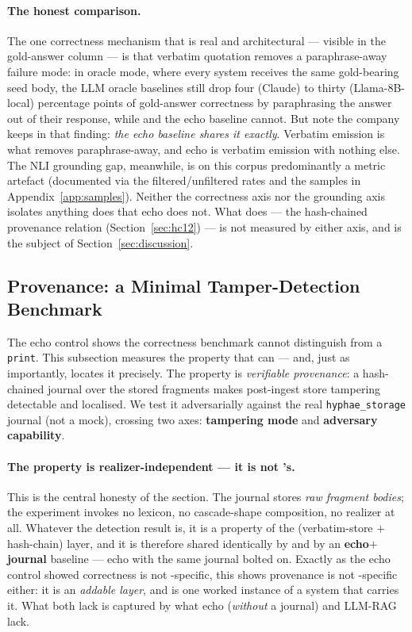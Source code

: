 \paragraph{The honest comparison.}
The one correctness mechanism that is real and architectural ---
visible in the gold-answer column --- is that verbatim quotation
removes a paraphrase-away failure mode: in oracle mode, where
every system receives the same gold-bearing seed body, the LLM
oracle baselines still drop four (Claude) to thirty
(Llama-8B-local) percentage points of gold-answer correctness by
paraphrasing the answer out of their response, while \hyphae{}
and the echo baseline cannot. But note the company \hyphae{}
keeps in that finding: \emph{the echo baseline shares it
exactly}. Verbatim emission is what removes paraphrase-away, and
echo is verbatim emission with nothing else. The NLI grounding
gap, meanwhile, is on this corpus predominantly a metric artefact
(documented via the filtered/unfiltered rates and the samples in
Appendix~\ref{app:samples}). Neither the correctness axis nor the
grounding axis isolates anything \hyphae{} does that echo does
not. What does --- the hash-chained provenance relation
(Section~\ref{sec:hc12}) --- is not measured by either axis, and
is the subject of Section~\ref{sec:discussion}.

\subsection{Provenance: a Minimal Tamper-Detection Benchmark}
\label{sec:results-provenance}

The echo control shows the correctness benchmark cannot
distinguish \hyphae{} from a \texttt{print}. This subsection
measures the property that can --- and, just as importantly,
locates it precisely. The property is \emph{verifiable
provenance}: a hash-chained journal over the stored fragments
makes post-ingest store tampering detectable and localised. We
test it adversarially against the real \texttt{hyphae\_storage}
journal (not a mock), crossing two axes: \textbf{tampering mode}
and \textbf{adversary capability}.

\paragraph{The property is realizer-independent --- it is not
\hyphae{}'s.} This is the central honesty of the section. The
journal stores \emph{raw fragment bodies}; the experiment invokes
no lexicon, no cascade-shape composition, no realizer at all.
Whatever the detection result is, it is a property of the
(verbatim-store $+$ hash-chain) layer, and it is therefore shared
identically by \hyphae{} and by an \textbf{echo$+$journal}
baseline --- echo with the same journal bolted on. Exactly as the
echo control showed correctness is not \hyphae{}-specific, this
shows provenance is not \hyphae{}-specific either: it is an
\emph{addable layer}, and \hyphae{} is one worked instance of a
system that carries it. What both lack is captured by what echo
(\emph{without} a journal) and LLM-RAG lack.

